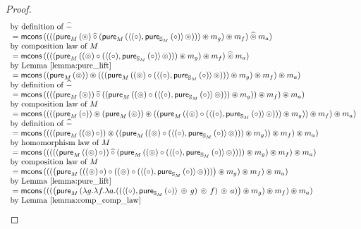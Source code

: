 \begin{lemma}
\begin{proof}
$$\begin{array}{ll}
\mbox{by definition of }\mathbin{\widehat{-}}\\
{}= \mathsf{mcons}\, ((((\mathsf{pure}_M\,(\circledcirc) \mathbin{\widehat{\circ}} (\mathsf{pure}_M\,(\langle (\circ), \mathsf{pure}_{\mathbb{S}_{M}}\,(\circ) \rangle\, \circledcirc))) \circledast m_g) \circledast m_f) \mathbin{\widehat{\circledcirc}} m_a)\\
\mbox{by composition law of }M\\
{}= \mathsf{mcons}\, ((((\mathsf{pure}_M\,((\circledcirc) \circ (\langle (\circ), \mathsf{pure}_{\mathbb{S}_{M}}\,(\circ) \rangle\, \circledcirc))) \circledast m_g) \circledast m_f) \mathbin{\widehat{\circledcirc}} m_a)\\
\mbox{by Lemma \ref{lemma:pure_lift}}\\
{}= \mathsf{mcons}\, ( (\mathsf{pure}_M\,(\circledcirc)) \circledast (((\mathsf{pure}_M\,((\circledcirc) \circ (\langle (\circ), \mathsf{pure}_{\mathbb{S}_{M}}\,(\circ) \rangle\, \circledcirc))) \circledast m_g) \circledast m_f) \circledast m_a)\\
\mbox{by definition of }\mathbin{\widehat{-}}\\
{}= \mathsf{mcons}\, ( ( ((\mathsf{pure}_M\,(\circledcirc)) \mathbin{\widehat{\circ}} ((\mathsf{pure}_M\,((\circledcirc) \circ (\langle (\circ), \mathsf{pure}_{\mathbb{S}_{M}}\,(\circ) \rangle\, \circledcirc))) \circledast m_g)) \circledast m_f) \circledast m_a) \\
\mbox{by composition law of }M\\
{}= \mathsf{mcons}\, ( ( ( (\mathsf{pure}_M\,(\circ)) \circledast (\mathsf{pure}_M\,(\circledcirc)) \circledast ((\mathsf{pure}_M\,((\circledcirc) \circ (\langle (\circ), \mathsf{pure}_{\mathbb{S}_{M}}\,(\circ) \rangle\, \circledcirc))) \circledast m_g)) \circledast m_f) \circledast m_a) \\
\mbox{by definition of }\mathbin{\widehat{-}}\\
{}= \mathsf{mcons}\, ( ( ( (\mathsf{pure}_M\,((\circledcirc)\, \circ)) \circledast ((\mathsf{pure}_M\,((\circledcirc) \circ (\langle (\circ), \mathsf{pure}_{\mathbb{S}_{M}}\,(\circ) \rangle\, \circledcirc))) \circledast m_g) ) \circledast m_f) \circledast m_a) \\
 \mbox{by homomorphism law of }M\\
 {}= \mathsf{mcons}\, ( ( ( ( (\mathsf{pure}_M\,((\circledcirc)\, \circ)) \mathbin{\widehat{\circ}} (\mathsf{pure}_M\,((\circledcirc) \circ (\langle (\circ), \mathsf{pure}_{\mathbb{S}_{M}}\,(\circ) \rangle\, \circledcirc)))  ) \circledast m_g ) \circledast m_f) \circledast m_a) \\
\mbox{by composition law of }M\\
 {}= \mathsf{mcons}\, ( ( ( \big(\mathsf{pure}_M\,(((\circledcirc)\, \circ) \circ ((\circledcirc) \circ (\langle (\circ), \mathsf{pure}_{\mathbb{S}_{M}}\,(\circ) \rangle\, \circledcirc)))\big) \circledast m_g ) \circledast m_f) \circledast m_a) \\
\mbox{by Lemma \ref{lemma:pure_lift}}\\
 {}= \mathsf{mcons}\, ( ( ( \big(\mathsf{pure}_M\,(\lambda g. \lambda f. \lambda a. ( ( \langle (\circ), \mathsf{pure}_{\mathbb{S}_{M}}\,(\circ) \rangle\, \circledcirc\, g )\, \circledcirc\, f )\, \circledcirc\, a) \big) \circledast m_g ) \circledast m_f) \circledast m_a) \\
 \mbox{by Lemma \ref{lemma:comp_comp_law}}\\
\end{array}
$$


\end{proof}
\end{lemma}
